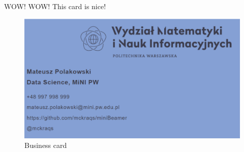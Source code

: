 \documentclass[ignorenonframetext,]{beamer}
\begin{document}
\begin{frame}{WOW! WOW! This card is nice!}
\protect\hypertarget{wow-wow-this-card-is-nice}{}

\begin{figure}
\centering
\includegraphics{card.png}
\caption{Business card}
\end{figure}

\end{frame}

\end{document}
